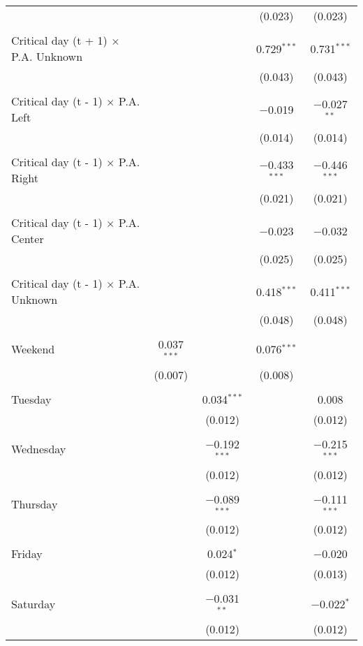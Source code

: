 \documentclass[
]{article}
\begin{document}
\begin{table}[!htbp]
{\begin{tabular}{@{\extracolsep{5pt}}lcccc}
  &  &  & (0.023) & (0.023) \\ 
  & & & & \\ 
 Critical day (t + 1) $\times$ P.A. Unknown &  &  & 0.729$^{***}$ & 0.731$^{***}$ \\ 
  &  &  & (0.043) & (0.043) \\ 
  & & & & \\ 
 Critical day (t - 1) $\times$ P.A. Left &  &  & $-$0.019 & $-$0.027$^{**}$ \\ 
  &  &  & (0.014) & (0.014) \\ 
  & & & & \\ 
 Critical day (t - 1) $\times$ P.A. Right &  &  & $-$0.433$^{***}$ & $-$0.446$^{***}$ \\ 
  &  &  & (0.021) & (0.021) \\ 
  & & & & \\ 
 Critical day (t - 1) $\times$ P.A. Center &  &  & $-$0.023 & $-$0.032 \\ 
  &  &  & (0.025) & (0.025) \\ 
  & & & & \\ 
 Critical day (t - 1) $\times$ P.A. Unknown &  &  & 0.418$^{***}$ & 0.411$^{***}$ \\ 
  &  &  & (0.048) & (0.048) \\ 
  & & & & \\ 
 Weekend & 0.037$^{***}$ &  & 0.076$^{***}$ &  \\ 
  & (0.007) &  & (0.008) &  \\ 
  & & & & \\ 
 Tuesday &  & 0.034$^{***}$ &  & 0.008 \\ 
  &  & (0.012) &  & (0.012) \\ 
  & & & & \\ 
 Wednesday &  & $-$0.192$^{***}$ &  & $-$0.215$^{***}$ \\ 
  &  & (0.012) &  & (0.012) \\ 
  & & & & \\ 
 Thursday &  & $-$0.089$^{***}$ &  & $-$0.111$^{***}$ \\ 
  &  & (0.012) &  & (0.012) \\ 
  & & & & \\ 
 Friday &  & 0.024$^{*}$ &  & $-$0.020 \\ 
  &  & (0.012) &  & (0.013) \\ 
  & & & & \\ 
 Saturday &  & $-$0.031$^{**}$ &  & $-$0.022$^{*}$ \\ 
  &  & (0.012) &  & (0.012) \\ 

\end{tabular}}
\end{table}
\end{document}

